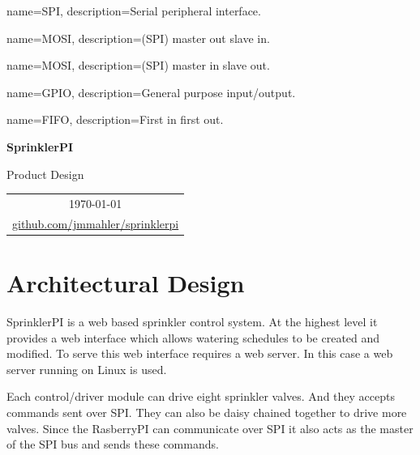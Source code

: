 \documentclass{article}
\begin{document}
\nocite{github_jmahler_sprinklerpi}


{
	name={SPI},
	description={Serial peripheral interface}.
}

{
	name={MOSI},
	description={(SPI) master out slave in}.
}

{
	name={MOSI},
	description={(SPI) master in slave out}.
}

{
	name={GPIO},
	description={General purpose input/output}.
}

{
	name={FIFO},
	description={First in first out}.
}


\vspace*{1.0in}

\centerline{\LARGE \textbf{SprinklerPI}}
\vspace{0.3in}
\centerline{\LARGE Product Design}

\vfill

\begin{center}
\begin{tabular}{c}
\today \\
\href{http://github.com/jmmahler/sprinklerpi}{github.com/jmmahler/sprinklerpi}
\end{tabular}
\end{center}

\vspace{2in}

\thispagestyle{empty}

\pagebreak

\nocite{rasberrypi}
\thispagestyle{empty}
\tableofcontents

\clearpage
\section{Architectural Design}

SprinklerPI is a web based sprinkler control system.
At the highest level it provides a web interface
which allows watering schedules to be created and modified.
To serve this web interface requires a web server.
In this case a web server running on Linux is used.

Each control/driver module can drive eight sprinkler valves.
And they accepts commands sent over SPI.
They can also be daisy chained together to drive more valves.
Since the RasberryPI can communicate over SPI it also
acts as the master of the SPI bus and sends these commands.
\end{document}
